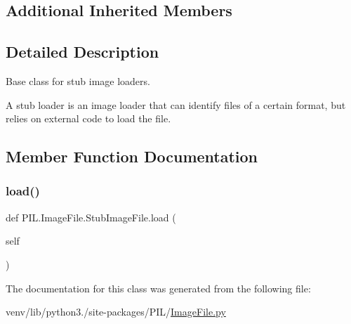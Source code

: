 \subsection*{Additional Inherited Members}


\subsection{Detailed Description}
\begin{DoxyVerb}Base class for stub image loaders.

A stub loader is an image loader that can identify files of a
certain format, but relies on external code to load the file.
\end{DoxyVerb}
 

\subsection{Member Function Documentation}
\mbox{\label{classPIL_1_1ImageFile_1_1StubImageFile_a718cdbea1ab0b6628bc32ef1d70cc681}} 
\subsubsection{\texorpdfstring{load()}{load()}}
{\footnotesize\ttfamily def P\+I\+L.\+Image\+File.\+Stub\+Image\+File.\+load (\begin{DoxyParamCaption}\item[{}]{self }\end{DoxyParamCaption})}



The documentation for this class was generated from the following file\+:\begin{DoxyCompactItemize}
\item 
venv/lib/python3./site-\/packages/\+P\+I\+L/\hyperlink{ImageFile_8py}{Image\+File.\+py}\end{DoxyCompactItemize}
